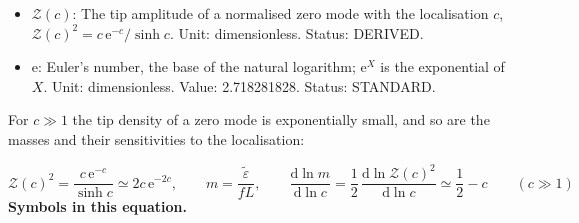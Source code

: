 \documentclass[
  10pt,
]{article}
\begin{document}
\begin{itemize}
  for \(c_R < 0\)). Unit: dimensionless. Value: doublets
  \(c_L = 3.38230\) (quarks) and 5.95288 (leptons); singlets \(c_R\): up
  \(-15.4300\), down \(-14.6258\), strange \(-11.5158\), charm
  \(-8.7683\), bottom \(-7.5005\), top \(-3.3823\), electron
  \(-14.5539\), muon \(-8.9809\), tau \(-5.9529\), neutrinos
  \(-35.0452\), \(-32.8481\), \(-31.0702\) (fixed by the measured
  masses). Status: DERIVED.
\item
  \(\mathcal{Z}(c)\): The tip amplitude of a normalised zero mode with
  the localisation \(c\),
  \(\mathcal{Z}(c)^2 = c\,\mathrm{e}^{-c}/\sinh c\). Unit:
  dimensionless. Status: DERIVED.
\item
  \(\mathrm{e}\): Euler's number, the base of the natural logarithm;
  \(\mathrm{e}^{X}\) is the exponential of \(X\). Unit: dimensionless.
  Value: 2.718281828. Status: STANDARD.
\end{itemize}

For \(c \gg 1\) the tip density of a zero mode is exponentially small,
and so are the masses and their sensitivities to the localisation:

\[ \mathcal{Z}(c)^2 = \frac{c\,\mathrm{e}^{-c}}{\sinh c} \simeq 2c\,\mathrm{e}^{-2c},\qquad m = \frac{\tilde\varepsilon}{fL},\qquad \frac{\mathrm{d}\ln m}{\mathrm{d}\ln c} = \frac12\,\frac{\mathrm{d}\ln\mathcal{Z}(c)^2}{\mathrm{d}\ln c} \simeq \frac12 - c\qquad (c \gg 1) \]
\textbf{Symbols in this equation.}
\end{document}
